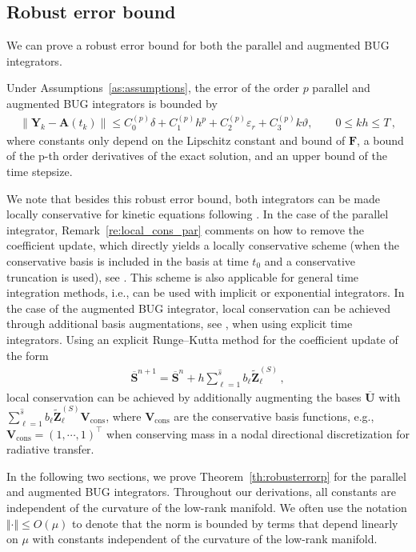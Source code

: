 \documentclass[preprint,runningheads]{svjour3}
\def\eps{\varepsilon}
\def\wt{\widetilde}
\def\wt{\overline}
\newcommand\bfA{{\mathbf A}}
\newcommand\bfF{{\mathbf F}}
\newcommand\bfS{{\mathbf S}}
\newcommand\bfU{{\mathbf U}}
\newcommand\bfV{{\mathbf V}}
\newcommand\bfY{{\mathbf Y}}
\newcommand\bfZ{{\mathbf Z}}
\def\eps{\varepsilon}
\begin{document}
\subsection{Robust error bound}
We can prove a robust error bound for both the parallel and augmented BUG integrators.
\begin{theorem}\label{th:robusterrorp} Under Assumptions~\ref{as:assumptions}, the error of the order $p$ parallel and augmented BUG integrators is bounded by
\begin{align}
    \| \bfY_k - \bfA(t_k)\|  \le C_0^{(p)} \delta + C_1^{(p)} h^p + C_2^{(p)} \eps_{r} + C_3^{(p)}  k\vartheta , \qquad 0\le kh \le T\,,
\end{align}
where constants only depend on the Lipschitz constant and bound of $\bfF$, a bound of {the p-th order} derivatives of the exact solution, and an upper bound of the time stepsize. 
\end{theorem}
 {We note that besides this robust error bound, both integrators can be made locally conservative for kinetic equations following \cite{einkemmer2023conservation}. In the case of the parallel integrator, Remark~\ref{re:local_cons_par} comments on how to remove the coefficient update, which directly yields a locally conservative scheme (when the conservative basis is included in the basis at time $t_0$ and a conservative truncation is used), see \cite[Section~7]{einkemmer2023conservation}. This scheme is also applicable for general time integration methods, i.e., can be used with implicit or exponential integrators. In the case of the augmented BUG integrator, local conservation can be achieved through additional basis augmentations, see \cite[Section~5]{einkemmer2023conservation}, when using explicit time integrators. Using an explicit Runge--Kutta method for the coefficient update of the form
\begin{align*}
    \wt \bfS^{n+1} = \wt \bfS^{n} + h \sum_{\ell=1}^{\hat s} b_{\ell} \widetilde \bfZ_{\ell}^{(S)}\,,
\end{align*}
local conservation can be achieved by additionally augmenting the bases $\wt\bfU$ with $\sum_{\ell=1}^{\hat s} b_{\ell} \widetilde \bfZ_{\ell}^{(S)}\bfV_{\mathrm{cons}}$, where $\bfV_{\mathrm{cons}}$ are the conservative basis functions, e.g., $\bfV_{\mathrm{cons}} = (1,\cdots,1)^{\top}$ when conserving mass in a nodal directional discretization for radiative transfer.
}

In the following two sections, we prove Theorem~\ref{th:robusterrorp} for the parallel and augmented BUG integrators. Throughout our derivations, all constants are independent of the curvature of the low-rank manifold. We often use the notation $\Vert \cdot \Vert \leq  O(\mu)$ to denote that the norm is bounded by terms that depend linearly on $\mu$ with constants independent of the curvature of the low-rank manifold. 
\end{document}
